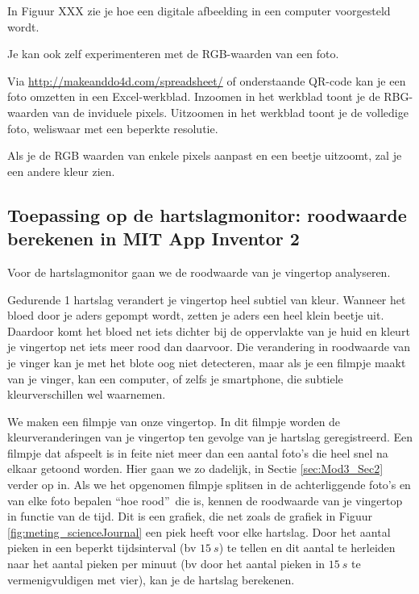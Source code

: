 In Figuur XXX zie je hoe een digitale afbeelding in een computer voorgesteld wordt.


Je kan ook zelf experimenteren met de RGB-waarden van een foto. 

Via \url{http://makeanddo4d.com/spreadsheet/} of onderstaande QR-code kan je een foto omzetten in een Excel-werkblad. Inzoomen in het werkblad toont je de RBG-waarden van de inviduele pixels. Uitzoomen in het werkblad toont je de volledige foto, weliswaar met een beperkte resolutie.



Als je de RGB waarden van enkele pixels aanpast en een beetje uitzoomt, zal je een andere kleur zien.


\subsection{Toepassing op de hartslagmonitor: roodwaarde berekenen in MIT App Inventor 2}

Voor de hartslagmonitor gaan we de roodwaarde van je vingertop analyseren. 

Gedurende 1 hartslag verandert je vingertop heel subtiel van kleur. 
Wanneer het bloed door je aders gepompt wordt, zetten je aders een heel klein beetje uit. Daardoor komt het bloed net iets dichter bij de oppervlakte van je huid en kleurt je vingertop net iets meer rood dan daarvoor.
Die verandering in roodwaarde van je vinger kan je met het blote oog niet detecteren, maar als je een filmpje maakt van je vinger, kan een computer, of zelfs je smartphone, die subtiele kleurverschillen wel waarnemen.

We maken een filmpje van onze vingertop. In dit filmpje worden de kleurveranderingen van je vingertop ten gevolge van je hartslag geregistreerd. Een filmpje dat afspeelt is in feite niet meer dan een aantal foto's die heel snel na elkaar getoond worden. Hier gaan we zo dadelijk, in Sectie \ref{sec:Mod3_Sec2} verder op in. Als we het opgenomen filmpje splitsen in de achterliggende foto's en van elke foto bepalen \textquotedblleft hoe rood\textquotedblright \  die is, kennen de roodwaarde van je vingertop in functie van de tijd. Dit is een grafiek, die net zoals de grafiek in Figuur \ref{fig:meting_scienceJournal} een piek heeft voor elke hartslag. Door het aantal pieken in een beperkt tijdsinterval (bv $15~s$) te tellen en dit aantal te herleiden naar het aantal pieken per minuut (bv door het aantal pieken in $15~s$ te vermenigvuldigen met vier), kan je de hartslag berekenen.

